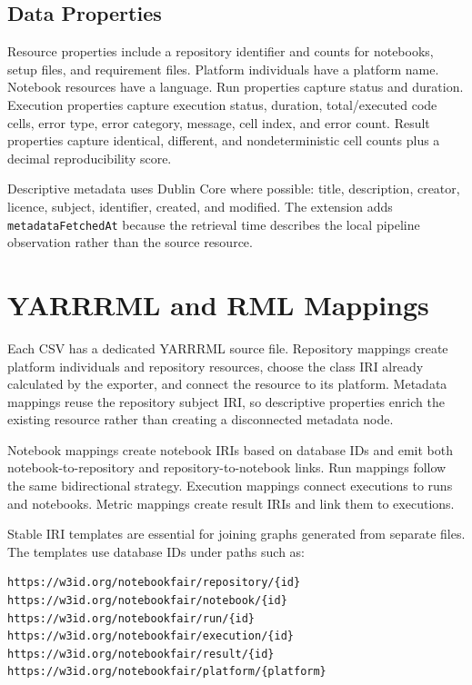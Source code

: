 \subsection{Data Properties}

Resource properties include a repository identifier and counts for notebooks, setup files, and requirement files. Platform individuals have a platform name. Notebook resources have a language. Run properties capture status and duration. Execution properties capture execution status, duration, total/executed code cells, error type, error category, message, cell index, and error count. Result properties capture identical, different, and nondeterministic cell counts plus a decimal reproducibility score.

Descriptive metadata uses Dublin Core where possible: title, description, creator, licence, subject, identifier, created, and modified. The extension adds \texttt{metadataFetchedAt} because the retrieval time describes the local pipeline observation rather than the source resource.

\section{YARRRML and RML Mappings}

Each CSV has a dedicated YARRRML source file. Repository mappings create platform individuals and repository resources, choose the class IRI already calculated by the exporter, and connect the resource to its platform. Metadata mappings reuse the repository subject IRI, so descriptive properties enrich the existing resource rather than creating a disconnected metadata node.

Notebook mappings create notebook IRIs based on database IDs and emit both notebook-to-repository and repository-to-notebook links. Run mappings follow the same bidirectional strategy. Execution mappings connect executions to runs and notebooks. Metric mappings create result IRIs and link them to executions.

Stable IRI templates are essential for joining graphs generated from separate files. The templates use database IDs under paths such as:

\begin{lstlisting}[caption={Representative IRI templates.}]
https://w3id.org/notebookfair/repository/{id}
https://w3id.org/notebookfair/notebook/{id}
https://w3id.org/notebookfair/run/{id}
https://w3id.org/notebookfair/execution/{id}
https://w3id.org/notebookfair/result/{id}
https://w3id.org/notebookfair/platform/{platform}
\end{lstlisting}

